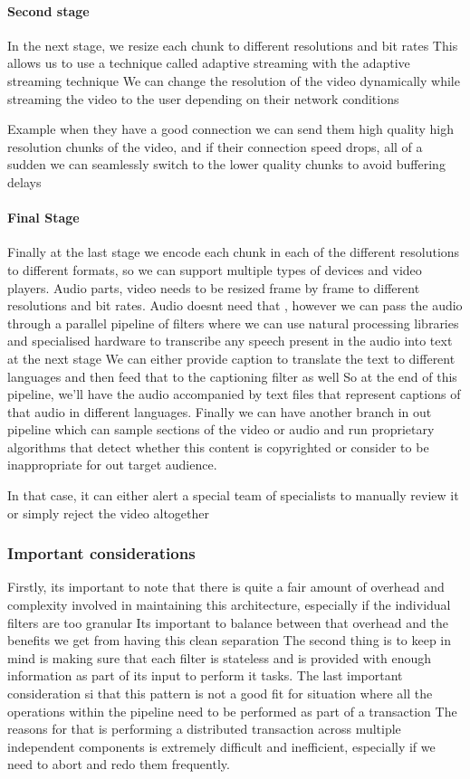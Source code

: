 \paragraph{Second stage}
In the next stage, we resize each chunk to different resolutions and bit rates
This allows us to use a technique called adaptive streaming with the adaptive streaming technique
We can change the resolution of the video dynamically while streaming the video to the user depending on their network conditions

Example when they have a good connection we can send them high quality high resolution chunks of the video, and if their connection speed drops, all of a sudden we can seamlessly switch to the lower quality chunks to avoid buffering delays

\paragraph{Final Stage}
Finally at the last stage we encode each chunk in each of the different resolutions to different formats, so we can support multiple types of devices and video players.
Audio parts, video needs to be resized frame by frame to different resolutions and bit rates.
Audio doesnt need that , however we can pass the audio through a parallel pipeline of filters where we can use natural processing libraries and specialised hardware to transcribe any speech present in the audio into text at the next stage
We can either provide caption to translate the text to different languages and then feed that to the captioning filter as well
So at the end of this pipeline, we'll have the audio accompanied by text files that represent captions of that audio in different languages.
Finally we can have another branch in out pipeline which can sample sections of the video or audio and run proprietary algorithms that detect whether this content is copyrighted or consider to be inappropriate for out target audience.

In that case, it can either alert a special team of specialists to manually review it or simply reject the video altogether

\subsubsection{Important considerations}
Firstly, its important to note that there is quite a fair amount of overhead and complexity involved in maintaining this architecture, especially if the individual filters are too granular
Its important to balance between that overhead and the benefits we get from having this clean separation
The second thing is to keep in mind is making sure that each filter is stateless and is provided with enough information as part of its input to perform it tasks.
The last important consideration si that this pattern is not a good fit for situation where all the operations within the pipeline need to be performed as part of a transaction
The reasons for that is performing a distributed transaction across multiple independent components is extremely difficult and inefficient, especially if we need to abort and redo them frequently.

